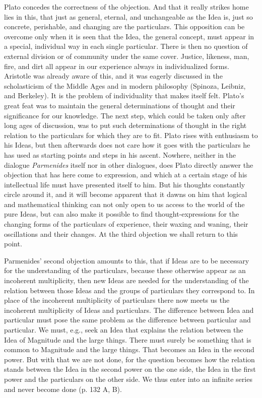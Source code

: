 \documentclass[12pt,a4paper,openany]{book}
\newcommand{\opage}[1]{\marginnote{\footnotesize\textit{[#1]}}}
\begin{document}
Plato concedes the correctness of the objection. And that it
really strikes home lies in this, that just as general, eternal, and unchangeable
as the Idea is, just so concrete, perishable, and
changing are the particulars. This opposition can be overcome only
when it is seen that the Idea, the general concept, must
appear in a special, individual way in each single
particular. There is then no question of external division or of
community under the same cover. Justice, likeness,
man, fire, and dirt all appear in our experience
always in individualized forms. Aristotle was already
aware of this, and it was eagerly discussed in the scholasticism of the Middle Ages
and in modern philosophy (Spinoza, Leibniz,
and Berkeley). It is the problem of individuality that makes
itself felt. Plato’s great feat was to maintain the general
determinations of thought and their significance for our knowledge.
The next step, which could be taken only after long ages
of discussion, was to put such determinations of thought in the
right relation to the particulars for which they are to fit. Plato
rises with enthusiasm to his Ideas, but then afterwards does not
care how it goes with the particulars
he has used as starting points and steps in his
ascent. Nowhere, neither in the dialogue \textit{Parmenides} itself
nor in other dialogues, does Plato directly answer the objection
that has here come to expression, and which at a certain
stage of his intellectual life must have presented itself to him. But
his thoughts constantly circle around it, and it will become apparent
that it dawns on him that logical and mathematical thinking
can not only open to us access to the world of the pure
Ideas, but can also make it possible to find
\setcounter{footnote}{0}%
\opage{16}thought-expressions for the changing forms of the particulars of experience, their waxing
and waning, their oscillations and their changes.
At the third objection we shall return to this
point.

Parmenides’ second objection amounts to this, that if
Ideas are to be necessary for the understanding of the particulars,
because these otherwise appear as an incoherent
multiplicity, then new Ideas are needed for the understanding
of the relation between those Ideas and the groups of particulars they
correspond to. In place of the incoherent multiplicity of particulars
there now meets us the incoherent multiplicity
of Ideas and particulars. The difference between Idea and particular must
pose the same problem as the difference between particular
and particular. We must, e.g., seek an Idea that explains the relation
between the Idea of Magnitude and the large things. There must
surely be something that is common to Magnitude and the large
things. That becomes an Idea in the second power. But with that
we are not done, for the question becomes how the relation
stands between the Idea in the second power on the one side,
the Idea in the first power and the particulars on the other side. We
thus enter into an infinite series and never become
done (p. 132 A, B).
\end{document}
